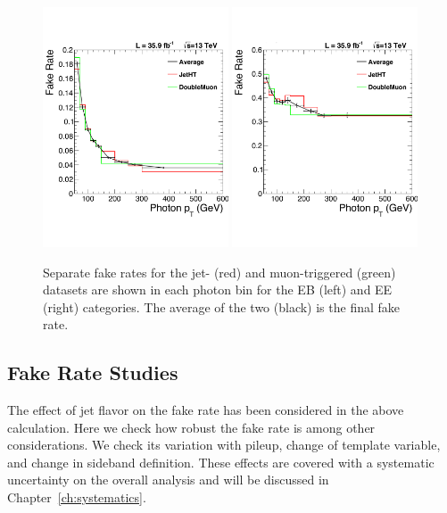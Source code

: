 \begin{figure}[!htbp]
  \centering
  \includegraphics[width=0.49\textwidth]{figures/datasetcompEB_2016.pdf}
  \includegraphics[width=0.49\textwidth]{figures/datasetcompEE_2016.pdf}
  \caption{Separate fake rates for the jet- (red) and muon-triggered (green) datasets are shown in each photon \pt bin for the EB (left) and EE (right) categories. The average of the two (black) is the final fake rate.}
  \label{fig:separate_fake_rates}
\end{figure}


\subsection{Fake Rate Studies}\label{ss:fr_studies}

The effect of jet flavor on the fake rate has been considered in the above calculation. Here we check how robust the fake rate is among other considerations. We check its variation with pileup, change of template variable, and change in sideband definition. These effects are covered with a systematic uncertainty on the overall analysis and will be discussed in Chapter~\ref{ch:systematics}.

